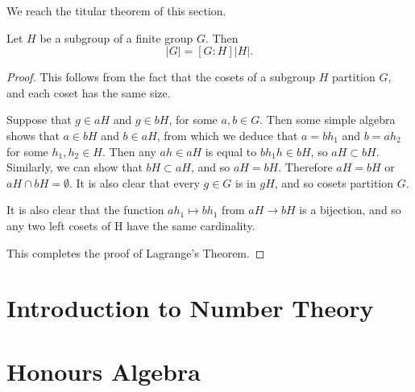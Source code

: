 \documentclass[12pt]{report}
\begin{document}
We reach the titular theorem of this section.

\begin{theorem}
  Let \(H\) be a subgroup of a finite group \(G\). Then
  \[|G| = [G : H]|H|.\]
\end{theorem}

\begin{proof}
  This follows from the fact that the cosets of a subgroup \(H\) partition \(G\), and each coset has the same size.


  Suppose that \(g \in aH\) and \(g \in bH\), for some \(a, b \in G\).
  Then some simple algebra shows that \(a \in bH\) and \(b \in aH\), from which we deduce that \(a = b h_{1}\) and \(b = a h_{2}\) for some \(h_{1}, h_{2} \in H\).
  Then any \(ah \in aH\) is equal to \(bh_{1}h \in bH\), so \(aH \subset bH\).
  Similarly, we can show that \(bH \subset aH\), and so \(aH = bH\).
  Therefore \(aH = bH\) or \(aH \cap bH = \emptyset\).
  It is also clear that every \(g \in G\) is in \(gH\), and so cosets partition \(G\).


  It is also clear that the function \(ah_{1} \mapsto bh_{1}\)  from \(aH \to bH\) is a bijection, and so any two left cosets of H have the same cardinality.

  This completes the proof of Lagrange's Theorem.
\end{proof}





































\chapter{Introduction to Number Theory}\label{cha:intr-numb-theory}
\chapter{Honours Algebra}\label{cha:honours-algebra}
\end{document}
